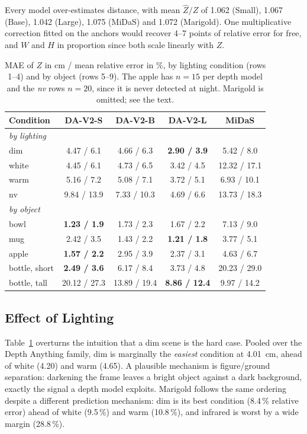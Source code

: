\documentclass[conference]{IEEEtran}
\begin{document}
Every model over-estimates distance, with mean $\hat Z/Z$ of 1.062 (Small),
1.067 (Base), 1.042 (Large), 1.075 (MiDaS) and 1.072 (Marigold). One
multiplicative correction fitted on the anchors would recover 4--7 points of
relative error for free, and $W$ and $H$ in proportion since both scale
linearly with $Z$.

\begin{table}[!t]
\centering
\caption{MAE of $Z$ in cm / mean relative error in \%, by lighting condition
(rows 1--4) and by object (rows 5--9). The apple has $n=15$ per depth model and
the \emph{nv} rows $n=20$, since it is never detected at night. Marigold is
omitted; see the text.}
\label{tab:groups}
\footnotesize
\setlength{\tabcolsep}{4pt}
\begin{tabular}{lcccc}
\toprule
Condition & DA-V2-S & DA-V2-B & DA-V2-L & MiDaS\\
\midrule
\multicolumn{5}{l}{\emph{by lighting}}\\
dim    & 4.47 / 6.1  & 4.66 / 6.3  & \textbf{2.90 / 3.9} & 5.42 / 8.0\\
white  & 4.45 / 6.1  & 4.73 / 6.5  & 3.42 / 4.5 & 12.32 / 17.1\\
warm   & 5.16 / 7.2  & 5.08 / 7.1  & 3.72 / 5.1 & 6.93 / 10.1\\
nv     & 9.84 / 13.9 & 7.33 / 10.3 & 4.69 / 6.6 & 13.73 / 18.3\\
\midrule
\multicolumn{5}{l}{\emph{by object}}\\
bowl   & \textbf{1.23 / 1.9} & 1.73 / 2.3 & 1.67 / 2.2 & 7.13 / 9.0\\
mug    & 2.42 / 3.5 & 1.43 / 2.2 & \textbf{1.21 / 1.8} & 3.77 / 5.1\\
apple  & \textbf{1.57 / 2.2} & 2.95 / 3.9 & 2.37 / 3.1 & 4.63 / 6.7\\
bottle, short & \textbf{2.49 / 3.6} & 6.17 / 8.4 & 3.73 / 4.8 & 20.23 / 29.0\\
bottle, tall  & 20.12 / 27.3 & 13.89 / 19.4 & \textbf{8.86 / 12.4} & 9.97 / 14.2\\
\bottomrule
\end{tabular}
\end{table}

\subsection{Effect of Lighting}
Table~\ref{tab:groups} overturns the intuition that a dim scene is the hard case.
Pooled over the Depth Anything family, dim is marginally the \emph{easiest}
condition at 4.01~cm, ahead of white (4.20) and warm (4.65). A plausible
mechanism is figure/ground separation: darkening the frame leaves a bright object
against a dark background, exactly the signal a depth model exploits. Marigold
follows the same ordering despite a different prediction mechanism: dim is its best
condition (8.4\,\% relative error) ahead of white (9.5\,\%) and warm (10.8\,\%),
and infrared is worst by a wide margin (28.8\,\%).
\end{document}
